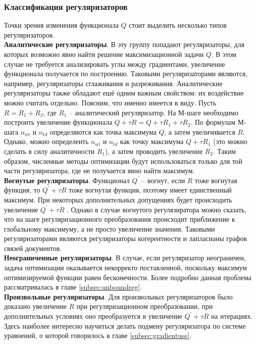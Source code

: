\documentclass[12pt]{article}
\begin{document}
           \subsubsection{Классификация регуляризаторов}
Точки зрения изменения функционала $Q$ стоит выделить несколько типов регуляризаторов.\\
	 \textbf{Аналитические регуляризаторы}. В эту группу попадают регуляризаторы, для которых возможно явно найти решение максимизационной задачи $Q$. В этом случае не требуется анализировать углы между градиентами, увеличение функционала получается по построению. Таковыми регуляризаторами являются, например, регуляризаторы сглаживания и разреживания. Аналитические регуляризаторы также обладают ешё одним важным свойством: их воздействие можно считать отдельно. Поясним, что именно имеется в виду. Пусть $R = R_1 + R_2$, где $R_1$ -- аналитический регуляризатор. На М-шаге необходимо построить увеличение функционала $Q + \tau R = Q + \tau R_1 + \tau R_2$. По формулам М-шага $n_{wt}$ и $n_{td}$ определяются как точка максимума $Q$, а затем увеличивается $R$.  Однако, можно определеить $n_{wt}$ и $n_{td}$ как точку максимума $Q + \tau R_1 $ (это можно сделать в силу аналитичности $R_1$), а затем проводить увеличение $R_2$. Таким образом,  численные методы оптимизации будут использоваться только для той части регуляризатора, где не получается явно найти максимум.\\
	\textbf{Вогнутые регуляризаторы}. Функционал $Q^{\prime}$ -- вогнут, если $R$ тоже вогнутая функция, то $Q^{\prime} + \tau R$ тоже вогнутая функция, поэтому имеет единственный максимум. При некоторых  дополнительных допущениях будет происходить увеличение $Q^{\prime} + \tau R$ . Однако в случае вогнутого регулязиратора можно сказать, что на шаге регуляризационного преобразования происходит приближение к глобальному максимуму, а не просто увеличение значения. Таковыми регуляризаторами являются регуляризаторы когерентности и лапласианы графов связей документов.\\
	\textbf{Неограниченные регуляризаторы}. В случае, если регуляризатор неограничен, задача оптимизации оказывается некорректо поставленной, поскольку максимум оптимизируемой функции равен бесконечности. Более подробно данная проблема  рассматривалась в главе \ref{subsec:unboundreg}.\\
	\textbf{Произвольные регуляризаторы}. Для произвольных регуляризаторов было доказано увеличение $R$ при регуляризационном преобразовании, при дополнительных условиях оно преобразуется в увеличение $Q^{\prime} + \tau R$ на итерациях. Здесь наиболее интересно научиться делать подмену регуляризатора по системе уравнений, о которой говорилось в главе \ref{subsec:gradientuse}.
\end{document}
